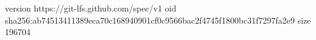 version https://git-lfs.github.com/spec/v1
oid sha256:ab74513411389eca70c168940901cf0c9566bac2f4745f1800bc31f7297fa2e9
size 196704
